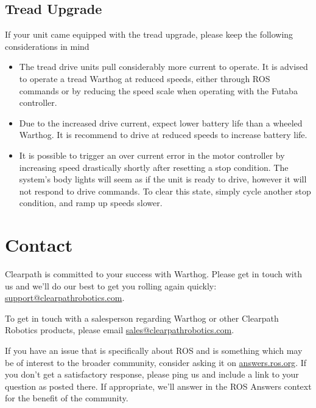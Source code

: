 \documentclass[]{clearpath-latex/clearpath-manual}
\begin{document}
\subsection{Tread Upgrade}
If your unit came equipped with the tread upgrade, please keep the following considerations in mind

\begin{itemize}
\item The tread drive units pull considerably more current to operate. It is advised to operate a tread Warthog at reduced speeds, either through ROS commands or by reducing the speed scale when operating with the Futaba controller.
\item Due to the increased drive current, expect lower battery life than a wheeled Warthog. It is recommend to drive at reduced speeds to increase battery life.
\item It is possible to trigger an over current error in the motor controller by increasing speed drastically shortly after resetting a stop condition. The system's body lights will seem as if the unit is ready to drive, however it will not respond to drive commands. To clear this state, simply cycle another stop condition, and ramp up speeds slower.
\end{itemize}

\section{Contact}
\label{contact}

Clearpath is committed to your success with Warthog. Please get in touch with us and we’ll do our best to get
you rolling again quickly: \url{support@clearpathrobotics.com}.

To get in touch with a salesperson regarding Warthog or other Clearpath Robotics products, please email
\url{sales@clearpathrobotics.com}.

If you have an issue that is specifically about ROS and is something which may be of interest to the broader
community, consider asking it on \url{answers.ros.org}. If you don’t get a satisfactory response, please ping us and
include a link to your question as posted there. If appropriate, we’ll answer in the ROS Answers context for
the benefit of the community.

\appendix

\thispagestyle{empty}

\thispagestyle{empty}
\end{document}
